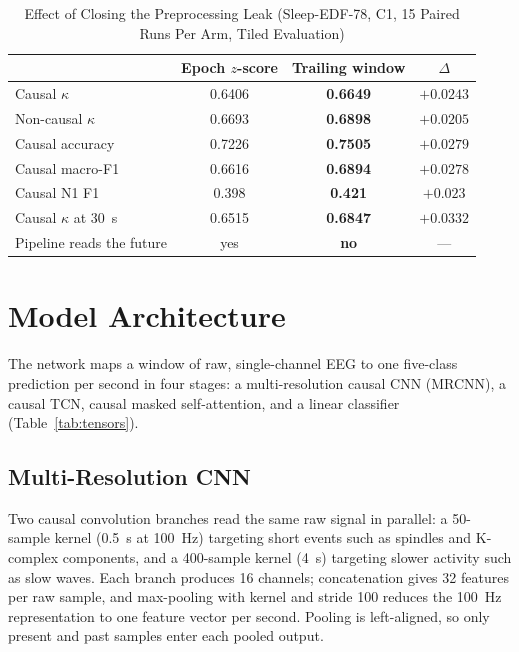 \documentclass[conference]{IEEEtran}
\begin{document}
\begin{table}[t]
\caption{Effect of Closing the Preprocessing Leak (Sleep-EDF-78, C1, 15 Paired Runs Per Arm,
Tiled Evaluation)}
\label{tab:leak}
\centering
\footnotesize
\setlength{\tabcolsep}{4pt}
\begin{tabular}{lccc}
\toprule
 & Epoch $z$-score & Trailing window & $\Delta$ \\
\midrule
Causal $\kappa$         & 0.6406 & \textbf{0.6649} & $+0.0243$ \\
Non-causal $\kappa$     & 0.6693 & \textbf{0.6898} & $+0.0205$ \\
Causal accuracy         & 0.7226 & \textbf{0.7505} & $+0.0279$ \\
Causal macro-F1         & 0.6616 & \textbf{0.6894} & $+0.0278$ \\
Causal N1 F1            & 0.398  & \textbf{0.421}  & $+0.023$  \\
Causal $\kappa$ at 30~s & 0.6515 & \textbf{0.6847} & $+0.0332$ \\
\midrule
Pipeline reads the future & yes & \textbf{no} & --- \\
\bottomrule
\end{tabular}
\end{table}

\section{Model Architecture}

The network maps a window of raw, single-channel EEG to one five-class prediction per second in
four stages: a multi-resolution causal CNN (MRCNN), a causal TCN, causal masked self-attention,
and a linear classifier (Table~\ref{tab:tensors}).

\subsection{Multi-Resolution CNN}

Two causal convolution branches read the same raw signal in parallel: a 50-sample kernel (0.5~s
at 100~Hz) targeting short events such as spindles and K-complex components, and a 400-sample
kernel (4~s) targeting slower activity such as slow waves. Each branch produces 16 channels;
concatenation gives 32 features per raw sample, and max-pooling with kernel and stride 100
reduces the 100~Hz representation to one feature vector per second. Pooling is left-aligned, so
only present and past samples enter each pooled output.
\end{document}
